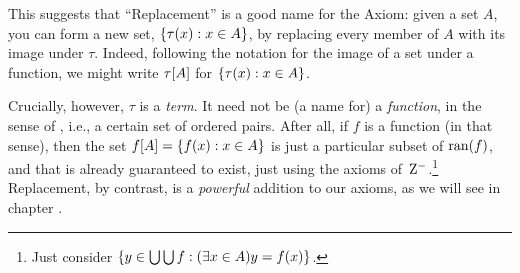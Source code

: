 \documentclass[../../../include/open-logic-section]{subfiles}
\begin{document}
This suggests that ``Replacement'' is a good name for the Axiom: given
a set $A$, you can form a new set, $\{ \tau(x) : x \in A \}$, by
replacing every member of $A$ with its image under $\tau$. Indeed,
following the notation for the image of a set under a function, we
might write $\tau[A]$ for $\{ \tau(x) : x \in A \}$.

Crucially, however, $\tau$ is a \emph{term}. It need not be (a name
for) a \emph{function}, in the sense of ,
i.e., a certain set of ordered pairs. After all, if $f$ is a function
(in that sense), then the set $f[A] = \{ f(x) : x \in
A \}$ is just a particular subset of $\mathrm{ran}(f)$, and that is already
guaranteed to exist, just using the axioms of~$\mathrm{Z}^{-}$.\footnote{Just
consider $\{ y \in \bigcup \bigcup f : (\exists x \in A)y =
f(x) \}$.} Replacement, by contrast, is a \emph{powerful} addition to
our axioms, as we will see in chapter .
\end{document}
